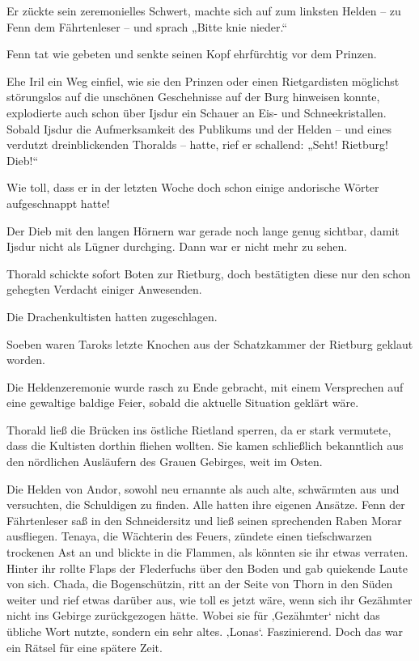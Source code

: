 Er zückte sein zeremonielles Schwert, machte sich auf zum linksten Helden – zu Fenn dem Fährtenleser – und sprach „Bitte knie nieder.“

Fenn tat wie gebeten und senkte seinen Kopf ehrfürchtig vor dem Prinzen.

Ehe Iril ein Weg einfiel, wie sie den Prinzen oder einen Rietgardisten möglichst störungslos auf die unschönen Geschehnisse auf der Burg hinweisen konnte, explodierte auch schon über Ijsdur ein Schauer an Eis- und Schneekristallen. Sobald Ijsdur die Aufmerksamkeit des Publikums und der Helden – und eines verdutzt dreinblickenden Thoralds – hatte, rief er schallend: „Seht! Rietburg! Dieb!“

Wie toll, dass er in der letzten Woche doch schon einige andorische Wörter aufgeschnappt hatte!

Der Dieb mit den langen Hörnern war gerade noch lange genug sichtbar, damit Ijsdur nicht als Lügner durchging. Dann war er nicht mehr zu sehen.

Thorald schickte sofort Boten zur Rietburg, doch bestätigten diese nur den schon gehegten Verdacht einiger Anwesenden.

Die Drachenkultisten hatten zugeschlagen.

Soeben waren Taroks letzte Knochen aus der Schatzkammer der Rietburg geklaut worden.\bigskip







Die Heldenzeremonie wurde rasch zu Ende gebracht, mit einem Versprechen auf eine gewaltige baldige Feier, sobald die aktuelle Situation geklärt wäre.

Thorald ließ die Brücken ins östliche Rietland sperren, da er stark vermutete, dass die Kultisten dorthin fliehen wollten. Sie kamen schließlich bekanntlich aus den nördlichen Ausläufern des Grauen Gebirges, weit im Osten.

Die Helden von Andor, sowohl neu ernannte als auch alte, schwärmten aus und versuchten, die Schuldigen zu finden. Alle hatten ihre eigenen Ansätze. Fenn der Fährtenleser saß in den Schneidersitz und ließ seinen sprechenden Raben Morar ausfliegen. Tenaya, die Wächterin des Feuers, zündete einen tiefschwarzen trockenen Ast an und blickte in die Flammen, als könnten sie ihr etwas verraten. Hinter ihr rollte Flaps der Flederfuchs über den Boden und gab quiekende Laute von sich. Chada, die Bogenschützin, ritt an der Seite von Thorn in den Süden weiter und rief etwas darüber aus, wie toll es jetzt wäre, wenn sich ihr Gezähmter nicht ins Gebirge zurückgezogen hätte. Wobei sie für ‚Gezähmter‘ nicht das übliche Wort nutzte, sondern ein sehr altes. ‚Lonas‘. Faszinierend. Doch das war ein Rätsel für eine spätere Zeit.

